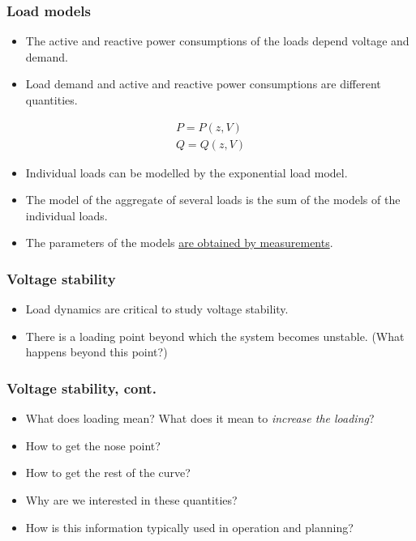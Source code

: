 \documentclass{beamer}
\newlength\fheight
\newlength\fwidth
\begin{document}
\begin{frame}
  \frametitle{Load models}
  \begin{itemize}
  \item The active and reactive power consumptions of the loads depend voltage and demand.
  \item Load demand and active and reactive power consumptions are different quantities.
  \end{itemize}
  \begin{align*}
    P = P(z,V)\\
    Q = Q(z,V)
  \end{align*}
  \begin{itemize}
  \item Individual loads can be modelled by the exponential load model.
  \item The model of the aggregate of several loads is the sum of the models of the individual loads.
  \item The parameters of the models \underline{are obtained by measurements}.
  \end{itemize}
\end{frame}

\begin{frame}
  \frametitle{Voltage stability}
  \begin{itemize}
  \item Load dynamics are critical to study voltage stability.
  \item There is a loading point beyond which the system becomes unstable. (What happens beyond this point?)
  \end{itemize}

\end{frame}

\begin{frame}
  \frametitle{Voltage stability, cont.}
  \begin{itemize}
  \item What does loading mean? What does it mean to \emph{increase the loading}?
  \item How to get the nose point?
  \item How to get the rest of the curve?
  \item Why are we interested in these quantities?
  \item How is this information typically used in operation and planning?
  \end{itemize}
\setlength\fheight{0.3\textheight} 
\setlength{}

\end{frame}
\end{document}
